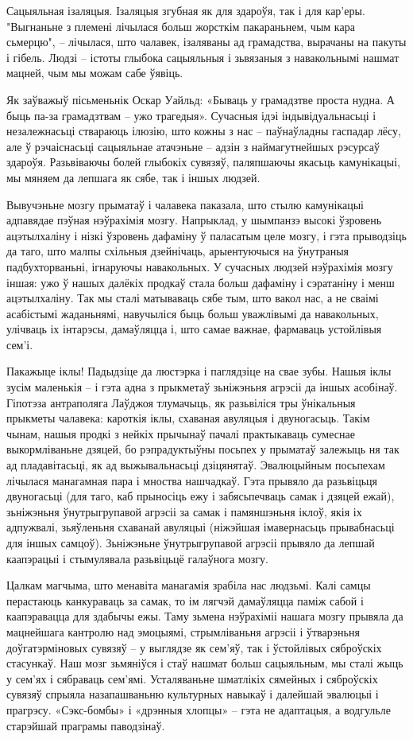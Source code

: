 Сацыяльная ізаляцыя. Ізаляцыя згубная як для здароўя, так і для кар'еры. "Выгнаньне з племені лічылася больш жорсткім пакараньнем, чым кара сьмерцю", – лічылася, што чалавек, ізаляваны ад грамадства, вырачаны на пакуты і гібель. Людзі – істоты глыбока сацыяльныя і зьвязаныя з навакольнымі нашмат мацней, чым мы можам сабе ўявіць.

Як заўважыў пісьменьнік Оскар Уайльд: «Бываць у грамадзтве проста нудна. А быць па-за грамадзтвам – ужо трагедыя». Сучасныя ідэі індывідуальнасьці і незалежнасьці ствараюць ілюзію, што кожны з нас – паўнаўладны гаспадар лёсу, але ў рэчаіснасьці сацыяльнае атачэньне – адзін з наймагутнейшых рэсурсаў здароўя. Разьвіваючы болей глыбокіх сувязяў, паляпшаючы якасьць камунікацыі, мы мяняем да лепшага як сябе, так і іншых людзей.

Вывучэньне мозгу прыматаў і чалавека паказала, што стылю камунікацыі адпавядае пэўная нэўрахімія мозгу. Напрыклад, у шымпанзэ высокі ўзровень ацэтылхаліну і нізкі ўзровень дафаміну ў паласатым целе мозгу, і гэта прыводзіць да таго, што малпы схільныя дзейнічаць, арыентуючыся на ўнутраныя падбухторваньні, ігнаруючы навакольных. У сучасных людзей нэўрахімія мозгу іншая: ужо ў нашых далёкіх продкаў стала больш дафаміну і сэратаніну і менш ацэтылхаліну. Так мы сталі матываваць сябе тым, што вакол нас, а не сваімі асабістымі жаданьнямі, навучыліся быць больш уважлівымі да навакольных, улічваць іх інтарэсы, дамаўляцца і, што самае важнае, фармаваць устойлівыя сем'і.

Пакажыце іклы! Падыдзіце да люстэрка і паглядзіце на свае зубы. Нашыя іклы зусім маленькія – і гэта адна з прыкметаў зьніжэньня агрэсіі да іншых асобінаў. Гіпотэза антраполяга Лаўджоя тлумачыць, як разьвіліся тры ўнікальныя прыкметы чалавека: кароткія іклы, схаваная авуляцыя і двуногасьць. Такім чынам, нашыя продкі з нейкіх прычынаў пачалі практыкаваць сумеснае выкормліваньне дзяцей, бо рэпрадуктыўны посьпех у прыматаў залежыць ня так ад пладавітасьці, як ад выжывальнасьці дзіцянятаў. Эвалюцыйным посьпехам лічылася манагамная пара і мноства нашчадкаў. Гэта прывяло да разьвіцьця двуногасьці (для таго, каб прыносіць ежу і забясьпечваць самак і дзяцей ежай), зьніжэньня ўнутрыгрупавой агрэсіі за самак і памяншэньня іклоў, якія іх адпужвалі, зьяўленьня схаванай авуляцыі (ніжэйшая імавернасьць прывабнасьці для іншых самцоў). Зьніжэньне ўнутрыгрупавой агрэсіі прывяло да лепшай каапэрацыі і стымулявала разьвіцьцё галаўнога мозгу.

Цалкам магчыма, што менавіта манагамія зрабіла нас людзьмі. Калі самцы перастаюць канкураваць за самак, то ім лягчэй дамаўляцца паміж сабой і каапэравацца для здабычы ежы. Таму зьмена нэўрахіміі нашага мозгу прывяла да мацнейшага кантролю над эмоцыямі, стрымліваньня агрэсіі і ўтварэньня доўгатэрміновых сувязяў – у выглядзе як сем'яў, так і ўстойлівых сяброўскіх стасункаў. Наш мозг зьмяніўся і стаў нашмат больш сацыяльным, мы сталі жыць у сем'ях і сябраваць сем'ямі. Усталяваньне шматлікіх сямейных і сяброўскіх сувязяў спрыяла назапашваньню культурных навыкаў і далейшай эвалюцыі і прагрэсу. «Сэкс-бомбы» і «дрэнныя хлопцы» – гэта не адаптацыя, а водгульле старэйшай праграмы паводзінаў.


